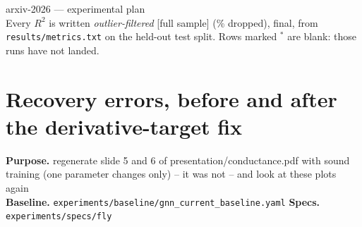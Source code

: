\documentclass[10pt,a4paper]{article}
\begin{document}
\begin{center}{\Large arxiv-2026 --- experimental plan}\\[2pt]
{\small Every $R^2$ is written \emph{outlier-filtered} [full sample] (\% dropped),
final, from \texttt{results/metrics.txt} on the held-out test split.
Rows marked $^{*}$ are blank: those runs have not landed.}\end{center}
\vspace{4pt}
\section*{Recovery errors, before and after the derivative-target fix}
{\small \textbf{Purpose.} regenerate slide 5 and 6 of presentation/conductance.pdf with sound training (one parameter changes only) -- it was not -- and look at these plots again}
\\[2pt]
{\small \textbf{Baseline.} \texttt{experiments/baseline/gnn\_current\_baseline.yaml} \quad \textbf{Specs.} \texttt{experiments/specs/fly}}
\end{document}
